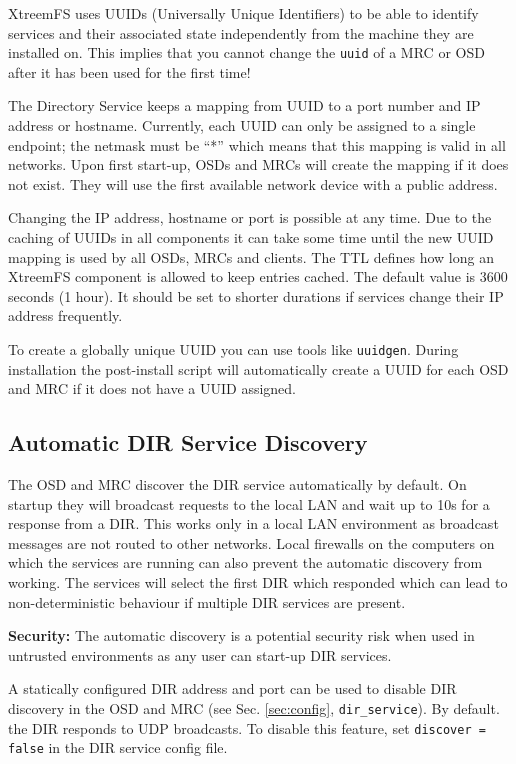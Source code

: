 \documentclass[a4paper,10pt]{book}
\begin{document}
XtreemFS uses UUIDs (Universally Unique Identifiers) to be able to identify services and their associated state independently from the machine they are installed on. This implies that you cannot change the \texttt{uuid} of a MRC or OSD after it has been used for the first time!

The Directory Service keeps a mapping from UUID to a port number and IP address or hostname. Currently, each UUID can only be assigned to a single endpoint; the netmask must be ``*'' which means that this mapping is valid in all networks. Upon first start-up, OSDs and MRCs will create the mapping if it does not exist. They will use the first available network device with a public address.

Changing the IP address, hostname or port is possible at any time. Due to the caching of UUIDs in all components it can take some time until the new UUID mapping is used by all OSDs, MRCs and clients. The TTL defines how long an XtreemFS component is allowed to keep entries cached. The default value is 3600 seconds (1 hour). It should be set to shorter durations if services change their IP address frequently.

To create a globally unique UUID you can use tools like \texttt{uuidgen}. During installation the post-install script will automatically create a UUID for each OSD and MRC if it does not have a UUID assigned.

\subsection{Automatic DIR Service Discovery}
\label{sec:autodiscover}
The OSD and MRC discover the DIR service automatically by default. On startup they will broadcast requests to the local LAN and wait up to 10s for a response from a DIR. This works only in a local LAN environment as broadcast messages are not routed to other networks. Local firewalls on the computers on which the services are running can also prevent the automatic discovery from working. The services will select the first DIR which responded which can lead to non-deterministic behaviour if multiple DIR services are present.

\textbf{Security:} The automatic discovery is a potential security risk when used in untrusted environments as any user can start-up DIR services.

A statically configured DIR address and port can be used to disable DIR discovery in the OSD and MRC (see Sec. \ref{sec:config}, \texttt{dir\_service}). By default. the DIR responds to UDP broadcasts. To disable this feature, set  \texttt{discover = false} in the DIR service config file.
\end{document}
